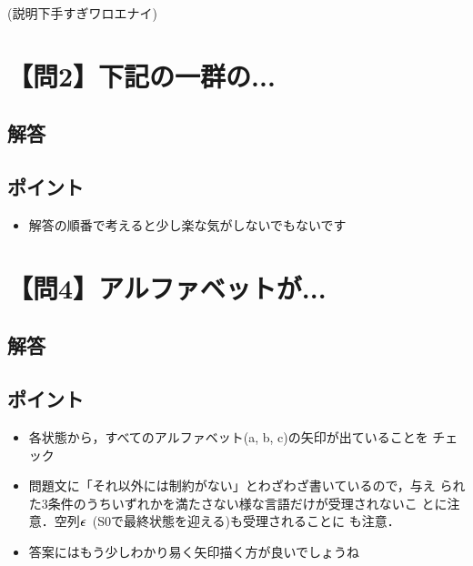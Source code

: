 (説明下手すぎワロエナイ)

\section*{【問2】下記の一群の...}
\subsection*{解答}

\subsection*{ポイント}
\begin{itemize}
 \item 解答の順番で考えると少し楽な気がしないでもないです
\end{itemize}

\section*{【問4】アルファベットが...}
\subsection*{解答}


\subsection*{ポイント}
\begin{itemize}
 \item 各状態から，すべてのアルファベット(a, b, c)の矢印が出ていることを
       チェック
 \item 問題文に「それ以外には制約がない」とわざわざ書いているので，与え
       られた3条件のうちいずれかを満たさない様な言語だけが受理されないこ
       とに注意．空列$\epsilon \hspace{1ex}$(S0で最終状態を迎える)も受理されることに
       も注意．
 \item 答案にはもう少しわかり易く矢印描く方が良いでしょうね
\end{itemize}



